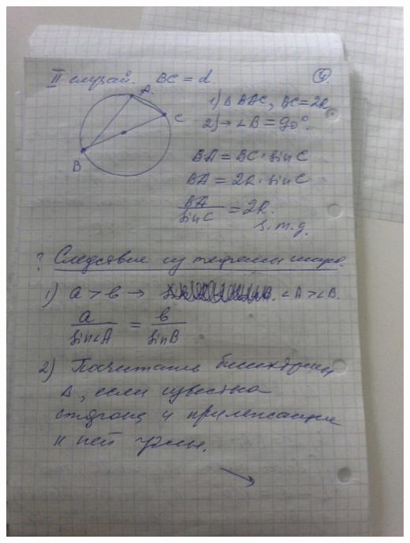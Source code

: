 \documentclass[12pt, letterpaper]{article}
\begin{document}
\includegraphics[scale=0.3]{photo7.jpg} \\
\end{document}
